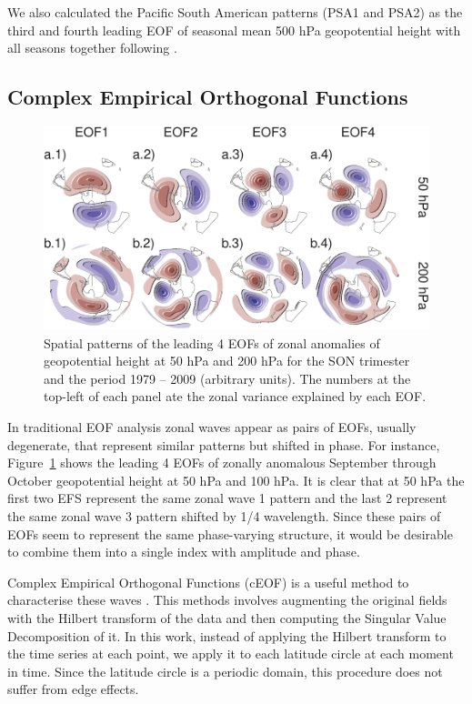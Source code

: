 \documentclass[smallextended]{svjour3}       %
\begin{document}
We also calculated the Pacific South American patterns (PSA1 and PSA2) as the third and fourth leading EOF of seasonal mean 500 hPa geopotential height with all seasons together following \citet{mo2001}.

\hypertarget{complex-empirical-orthogonal-functions}{%
\subsection{Complex Empirical Orthogonal Functions}\label{complex-empirical-orthogonal-functions}}



\begin{figure}
\centering
\includegraphics{../figures/eof-naive-1.pdf}
\caption{\label{fig:eof-naive}Spatial patterns of the leading 4 EOFs of zonal anomalies of geopotential height at 50 hPa and 200 hPa for the SON trimester and the period 1979 -- 2009 (arbitrary units). The numbers at the top-left of each panel ate the zonal variance explained by each EOF.}
\end{figure}

In traditional EOF analysis zonal waves appear as pairs of EOFs, usually degenerate, that represent similar patterns but shifted in phase. For instance, Figure~\ref{fig:eof-naive} shows the leading 4 EOFs of zonally anomalous September through October geopotential height at 50 hPa and 100 hPa. It is clear that at 50 hPa the first two EFS represent the same zonal wave 1 pattern and the last 2 represent the same zonal wave 3 pattern shifted by 1/4 wavelength. Since these pairs of EOFs seem to represent the same phase-varying structure, it would be desirable to combine them into a single index with amplitude and phase.

Complex Empirical Orthogonal Functions (cEOF) is a useful method to characterise these waves \citep{horel1984}. This methods involves augmenting the original fields with the Hilbert transform of the data and then computing the Singular Value Decomposition of it. In this work, instead of applying the Hilbert transform to the time series at each point, we apply it to each latitude circle at each moment in time. Since the latitude circle is a periodic domain, this procedure does not suffer from edge effects.
\end{document}
